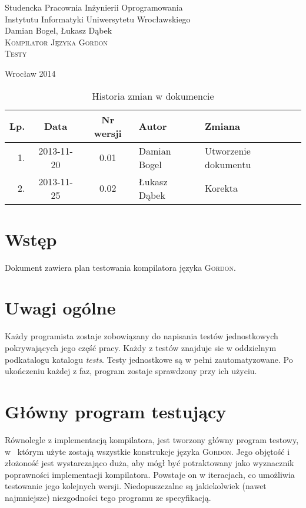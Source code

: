 \documentclass{documentation}
\begin{document}
\begin{titlepage}
\begin{center}
Studencka Pracownia Inżynierii Oprogramowania\\
Instytutu Informatyki Uniwersytetu Wrocławskiego\\[6cm]

Damian Bogel, Łukasz Dąbek\\[1cm]
\textsc{\LARGE Kompilator Języka Gordon}\\[0.5cm]
\textsc{\large Testy}

\vfill
Wrocław 2014 \\[2.5cm]

\end{center}
\end{titlepage}

\newpage
\begin{table}
	\centering
    \captionsetup{name=Tabela}
	\caption{Historia zmian w dokumencie}
		\begin{tabular}{|r|c|c|l|l|}
		\hline
		Lp.  & Data       & Nr wersji & Autor                 & Zmiana \\ \hline
		1.   & 2013-11-20 & 0.01 & Damian Bogel & Utworzenie dokumentu \\ \hline
		2.   & 2013-11-25 & 0.02 & Łukasz Dąbek & Korekta \\ \hline
	\end{tabular}
\end{table}
\newpage

\tableofcontents
\setcounter{page}{2}

\newpage

\section{Wstęp}
\noindent Dokument zawiera plan testowania kompilatora języka
\textsc{Gordon}.

\section{Uwagi ogólne}
\noindent Każdy programista zostaje zobowiązany do napisania testów
jednostkowych pokrywających jego część pracy. Każdy z testów znajduje sie w
oddzielnym podkatalogu katalogu \emph{tests}. Testy jednostkowe są w pełni
zautomatyzowane. Po ukończeniu każdej z faz, program zostaje sprawdzony przy
ich użyciu.

\section{Główny program testujący}
\noindent Równolegle z implementacją kompilatora, jest tworzony główny program
testowy, w~ którym użyte zostają wszystkie konstrukcje języka \textsc{Gordon}.
Jego objętość i złożoność jest wystarczająco duża, aby mógł być potraktowany
jako wyznacznik poprawności implementacji kompilatora. Powstaje on w iteracjach,
co umożliwia testowanie jego kolejnych wersji. Niedopuszczalne są
jakiekolwiek (nawet najmniejsze) niezgodności tego programu ze specyfikacją.
\end{document}
